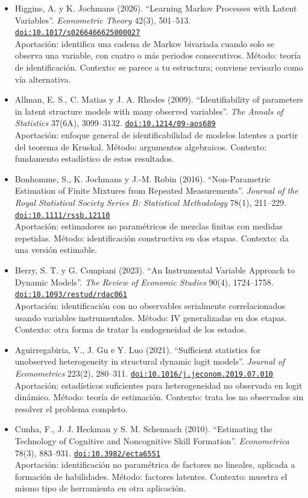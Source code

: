 \documentclass[11pt]{article}
\begin{document}
\begin{itemize}
\item Higgins, A. y K. Jochmans (2026). ``Learning Markov Processes with Latent Variables''. \textit{Econometric Theory} 42(3), 501--513. \href{https://doi.org/10.1017/s0266466625000027}{\texttt{doi:10.1017/s0266466625000027}}\\
Aportación: identifica una cadena de Markov bivariada cuando solo se observa una variable, con cuatro o más periodos consecutivos. Método: teoría de identificación. Contexto: se parece a tu estructura; conviene revisarlo como vía alternativa.
\item Allman, E. S., C. Matias y J. A. Rhodes (2009). ``Identifiability of parameters in latent structure models with many observed variables''. \textit{The Annals of Statistics} 37(6A), 3099--3132. \href{https://doi.org/10.1214/09-aos689}{\texttt{doi:10.1214/09-aos689}}\\
Aportación: enfoque general de identificabilidad de modelos latentes a partir del teorema de Kruskal. Método: argumentos algebraicos. Contexto: fundamento estadístico de estos resultados.
\item Bonhomme, S., K. Jochmans y J.-M. Robin (2016). ``Non-Parametric Estimation of Finite Mixtures from Repeated Measurements''. \textit{Journal of the Royal Statistical Society Series B: Statistical Methodology} 78(1), 211--229. \href{https://doi.org/10.1111/rssb.12110}{\texttt{doi:10.1111/rssb.12110}}\\
Aportación: estimadores no paramétricos de mezclas finitas con medidas repetidas. Método: identificación constructiva en dos etapas. Contexto: da una versión estimable.
\item Berry, S. T. y G. Compiani (2023). ``An Instrumental Variable Approach to Dynamic Models''. \textit{The Review of Economic Studies} 90(4), 1724--1758. \href{https://doi.org/10.1093/restud/rdac061}{\texttt{doi:10.1093/restud/rdac061}}\\
Aportación: identificación con no observables serialmente correlacionados usando variables instrumentales. Método: IV generalizadas en dos etapas. Contexto: otra forma de tratar la endogeneidad de los estados.
\item Aguirregabiria, V., J. Gu e Y. Luo (2021). ``Sufficient statistics for unobserved heterogeneity in structural dynamic logit models''. \textit{Journal of Econometrics} 223(2), 280--311. \href{https://doi.org/10.1016/j.jeconom.2019.07.010}{\texttt{doi:10.1016/j.jeconom.2019.07.010}}\\
Aportación: estadísticos suficientes para heterogeneidad no observada en logit dinámico. Método: teoría de estimación. Contexto: trata los no observados sin resolver el problema completo.
\item Cunha, F., J. J. Heckman y S. M. Schennach (2010). ``Estimating the Technology of Cognitive and Noncognitive Skill Formation''. \textit{Econometrica} 78(3), 883--931. \href{https://doi.org/10.3982/ecta6551}{\texttt{doi:10.3982/ecta6551}}\\
Aportación: identificación no paramétrica de factores no lineales, aplicada a formación de habilidades. Método: factores latentes. Contexto: muestra el mismo tipo de herramienta en otra aplicación.
\end{itemize}
\end{document}
